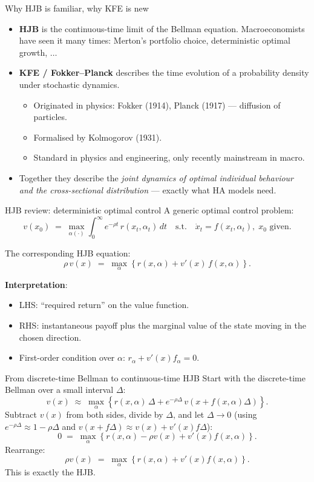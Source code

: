 \begin{frame}{Why HJB is familiar, why KFE is new}
\begin{itemize}
\item \textbf{HJB} is the continuous-time limit of the Bellman equation. Macroeconomists have seen it many times: Merton's portfolio choice, deterministic optimal growth, $\ldots$
\medskip
\item \textbf{KFE / Fokker--Planck} describes the time evolution of a probability density under stochastic dynamics.
  \begin{itemize}
  \item Originated in physics: Fokker (1914), Planck (1917) --- diffusion of particles.
  \item Formalised by Kolmogorov (1931).
  \item Standard in physics and engineering, only recently mainstream in macro.
  \end{itemize}
\medskip
\item Together they describe the \emph{joint dynamics of optimal individual behaviour and the cross-sectional distribution} --- exactly what HA models need.
\end{itemize}
\end{frame}

\begin{frame}{HJB review: deterministic optimal control}
A generic optimal control problem:
\[
v(x_0) \;=\; \max_{\alpha(\cdot)} \int_0^\infty e^{-\rho t}\, r(x_t, \alpha_t)\, dt
\quad\text{s.t.}\quad \dot x_t = f(x_t, \alpha_t),\; x_0 \text{ given}.
\]
\medskip

The corresponding HJB equation:
\[
\rho\, v(x) \;=\; \max_{\alpha}\left\{r(x,\alpha) + v'(x)\,f(x,\alpha)\right\}.
\]
\medskip

\textbf{Interpretation}:
\begin{itemize}
\item LHS: ``required return'' on the value function.
\item RHS: instantaneous payoff plus the marginal value of the state moving in the chosen direction.
\item First-order condition over $\alpha$: $r_\alpha + v'(x) f_\alpha = 0$.
\end{itemize}
\end{frame}

\begin{frame}{From discrete-time Bellman to continuous-time HJB}
Start with the discrete-time Bellman over a small interval $\Delta$:
\[
v(x) \;\approx\; \max_{\alpha}\!\left\{r(x,\alpha)\,\Delta + e^{-\rho\Delta}\, v(x + f(x,\alpha)\Delta)\right\}.
\]
\medskip
Subtract $v(x)$ from both sides, divide by $\Delta$, and let $\Delta \to 0$ (using $e^{-\rho\Delta} \approx 1 - \rho\Delta$ and $v(x + f\Delta) \approx v(x) + v'(x) f\Delta$):
\[
0 \;=\; \max_\alpha\!\left\{r(x,\alpha) - \rho v(x) + v'(x) f(x,\alpha)\right\}.
\]
\medskip
Rearrange:
\[
\rho v(x) \;=\; \max_\alpha\!\left\{r(x,\alpha) + v'(x) f(x,\alpha)\right\}.
\]
\medskip
This is exactly the HJB.
\end{frame}

